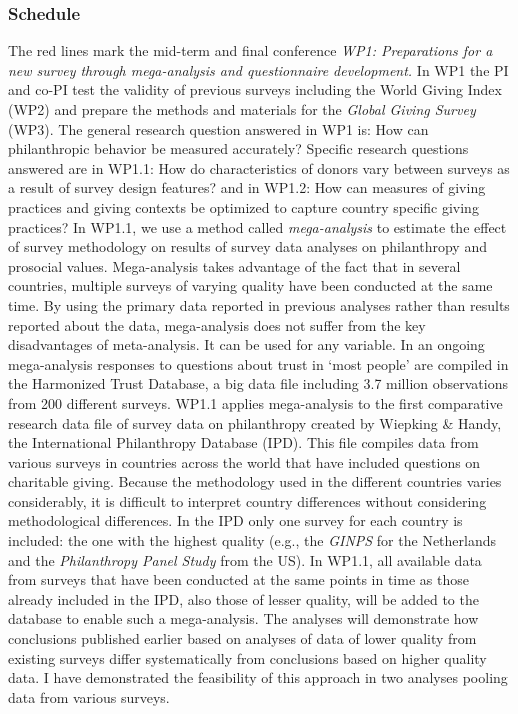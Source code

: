 \documentclass[twocolumn, serif, rga, numeric]{jote-article}
\begin{document}
 {}\subsubsection*{Schedule} 


The red lines mark the mid-term and final conference 
\emph{WP1: Preparations for a new survey through mega-analysis and questionnaire development.} In WP1 the PI and co-PI test the validity of previous surveys including the World Giving Index (WP2) and prepare the methods and materials for the \emph{Global Giving Survey} (WP3). The general research question answered in WP1 is: How can philanthropic behavior be measured accurately? Specific research questions answered are in WP1.1: How do characteristics of donors vary between surveys as a result of survey design features? and in WP1.2: How can measures of giving practices and giving contexts be optimized to capture country specific giving practices? 
In WP1.1, we use a method called \emph{mega-analysis} to estimate the effect of survey methodology on results of survey data analyses on philanthropy and prosocial values. Mega-analysis takes advantage of the fact that in several countries, multiple surveys of varying quality have been conducted at the same time.\cite{Bekkers2016d} By using the primary data reported in previous analyses rather than results reported about the data, mega-analysis does not suffer from the key disadvantages of meta-analysis. It can be used for any variable. In an ongoing mega-analysis responses to questions about trust in `most people' are compiled in the Harmonized Trust Database, a big data file including 3.7 million observations from 200 different surveys. WP1.1 applies mega-analysis to the first comparative research data file of survey data on philanthropy created by Wiepking \& Handy, the International Philanthropy Database (IPD).\cite{Wiepking2015, Wiepking2015} This file compiles data from various surveys in countries across the world that have included questions on charitable giving. Because the methodology used in the different countries varies considerably, it is difficult to interpret country differences without considering methodological differences. In the IPD only one survey for each country is included: the one with the highest quality (e.g., the \emph{GINPS} for the Netherlands and the \emph{Philanthropy Panel Study} from the US).\cite{Wilhelm2006} In WP1.1, all available data from surveys that have been conducted at the same points in time as those already included in the IPD, also those of lesser quality, will be added to the database to enable such a mega-analysis. The analyses will demonstrate how conclusions published earlier based on analyses of data of lower quality from existing surveys differ systematically from conclusions based on higher quality data. I have demonstrated the feasibility of this approach in two analyses pooling data from various surveys.\cite{Bekkers2016, Bekkers2006a}
\end{document}
